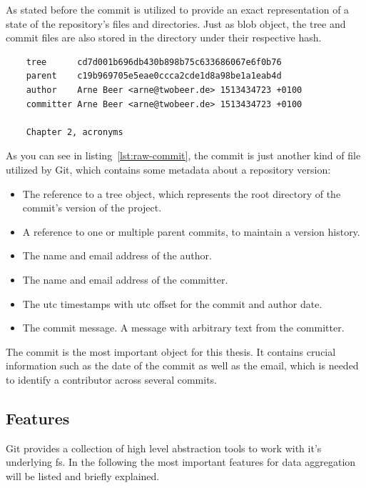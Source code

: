 As stated before the commit is utilized to provide an exact representation of a state of the repository's files and directories.
Just as blob object, the tree and commit files are also stored in the  directory under their respective hash.

\begin{verbatim}
    tree      cd7d001b696db430b898b75c633686067e6f0b76
    parent    c19b969705e5eae0ccca2cde1d8a98be1a1eab4d
    author    Arne Beer <arne@twobeer.de> 1513434723 +0100
    committer Arne Beer <arne@twobeer.de> 1513434723 +0100

    Chapter 2, acronyms
\end{verbatim}
\begingroup
{}
\endgroup

As you can see in listing~\ref{lst:raw-commit}, the commit is just another kind of file utilized by Git, which contains some metadata about a repository version:

\begin{itemize}
    \item The reference to a tree object, which represents the root directory of the commit's version of the project.
    \item A reference to one or multiple parent commits, to maintain a version history.
    \item The name and email address of the author.
    \item The name and email address of the committer.
    \item The \ac{utc} timestamps with \ac{utc} offset for the commit and author date.
    \item The commit message. A message with arbitrary text from the committer.
\end{itemize}

The commit is the most important object for this thesis.
It contains crucial information such as the date of the commit as well as the email, which is needed to identify a contributor across several commits.

\subsection{Features}
Git provides a collection of high level abstraction tools to work with it's underlying \ac{fs}.
In the following the most important features for data aggregation will be listed and briefly explained.

